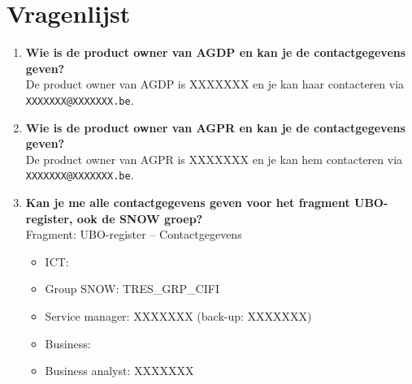\section{Vragenlijst}
\label{vragenlijst}

\begin{enumerate}
    \item \textbf{Wie is de product owner van AGDP en kan je de contactgegevens geven?} \\
    De product owner van AGDP is XXXXXXX en je kan haar contacteren via \texttt{XXXXXXX@XXXXXXX.be}.
    
    \item \textbf{Wie is de product owner van AGPR en kan je de contactgegevens geven?} \\
    De product owner van AGPR is XXXXXXX
    en je kan hem contacteren via \texttt{XXXXXXX@XXXXXXX.be}.
    
    \item \textbf{Kan je me alle contactgegevens geven voor het fragment UBO-register, ook de SNOW groep?} \\
    Fragment: UBO-register – Contactgegevens
    \begin{itemize}
        \item ICT:
        \item Group SNOW: TRES\_GRP\_CIFI
        \item Service manager: XXXXXXX (back-up: XXXXXXX)
        \item Business:
        \item Business analyst: XXXXXXX
    \end{itemize}
    

\end{enumerate}
